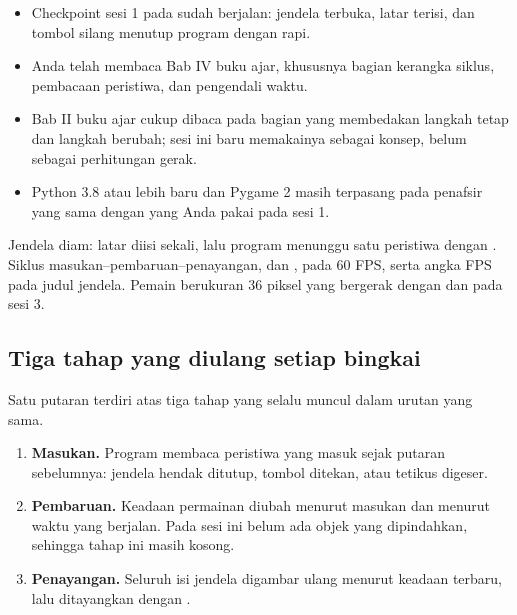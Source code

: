 \begin{prasyaratbox}
\begin{itemize}[leftmargin=1.4em, itemsep=0.25em]
  \item Checkpoint sesi 1 pada  sudah berjalan: jendela
        terbuka, latar terisi, dan tombol silang menutup program dengan rapi.
  \item Anda telah membaca Bab IV buku ajar, khususnya bagian kerangka siklus,
        pembacaan peristiwa, dan pengendali waktu.
  \item Bab II buku ajar cukup dibaca pada bagian yang membedakan langkah tetap
        dan langkah berubah; sesi ini baru memakainya sebagai konsep, belum
        sebagai perhitungan gerak.
  \item Python 3.8 atau lebih baru dan Pygame 2 masih terpasang pada penafsir
        yang sama dengan yang Anda pakai pada sesi 1.
\end{itemize}
\end{prasyaratbox}


\petasesi
  {Jendela diam: latar diisi sekali, lalu program menunggu satu peristiwa
   dengan .}
  {Siklus masukan--pembaruan--penayangan,  dan
   ,  pada 60 FPS, serta angka FPS pada judul jendela.}
  {Pemain berukuran 36 piksel yang bergerak dengan  dan
    pada sesi 3.}


\subsection*{Tiga tahap yang diulang setiap bingkai}

Satu putaran  terdiri atas tiga tahap yang selalu muncul
dalam urutan yang sama.

\begin{enumerate}[leftmargin=1.6em, itemsep=0.2em]
  \item \textbf{Masukan.} Program membaca peristiwa yang masuk sejak putaran
        sebelumnya: jendela hendak ditutup, tombol ditekan, atau tetikus
        digeser.
  \item \textbf{Pembaruan.} Keadaan permainan diubah menurut masukan dan
        menurut waktu yang berjalan. Pada sesi ini belum ada objek yang
        dipindahkan, sehingga tahap ini masih kosong.
  \item \textbf{Penayangan.} Seluruh isi jendela digambar ulang menurut keadaan
        terbaru, lalu ditayangkan dengan .
\end{enumerate}


